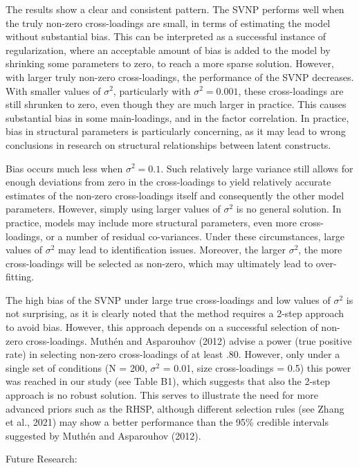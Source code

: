 \documentclass[
  man, donotrepeattitle,floatsintext]{apa6}
\begin{document}
The results show a clear and consistent pattern. The SVNP performs well when the truly non-zero cross-loadings are small, in terms of estimating the model without substantial bias. This can be interpreted as a successful instance of regularization, where an acceptable amount of bias is added to the model by shrinking some parameters to zero, to reach a more sparse solution. However, with larger truly non-zero cross-loadings, the performance of the SVNP decreases. With smaller values of \(\sigma^2\), particularly with \(\sigma^2 = 0.001\), these cross-loadings are still shrunken to zero, even though they are much larger in practice. This causes substantial bias in some main-loadings, and in the factor correlation. In practice, bias in structural parameters is particularly concerning, as it may lead to wrong conclusions in research on structural relationships between latent constructs.

Bias occurs much less when \(\sigma^2 = 0.1\). Such relatively large variance still allows for enough deviations from zero in the cross-loadings to yield relatively accurate estimates of the non-zero cross-loadings itself and consequently the other model parameters. However, simply using larger values of \(\sigma^2\) is no general solution. In practice, models may include more structural parameters, even more cross-loadings, or a number of residual co-variances. Under these circumstances, large values of \(\sigma^2\) may lead to identification issues. Moreover, the larger \(\sigma^2\), the more cross-loadings will be selected as non-zero, which may ultimately lead to over-fitting.

The high bias of the SVNP under large true cross-loadings and low values of \(\sigma^2\) is not surprising, as it is clearly noted that the method requires a 2-step approach to avoid bias. However, this approach depends on a successful selection of non-zero cross-loadings. Muthén and Asparouhov (2012) advise a power (true positive rate) in selecting non-zero cross-loadings of at least .80. However, only under a single set of conditions (N = 200, \(\sigma^2\) = 0.01, size cross-loadings = 0.5) this power was reached in our study (see Table B1), which suggests that also the 2-step approach is no robust solution. This serves to illustrate the need for more advanced priors such as the RHSP, although different selection rules (see Zhang et al., 2021) may show a better performance than the 95\% credible intervals suggested by Muthén and Asparouhov (2012).

Future Research:
\end{document}
